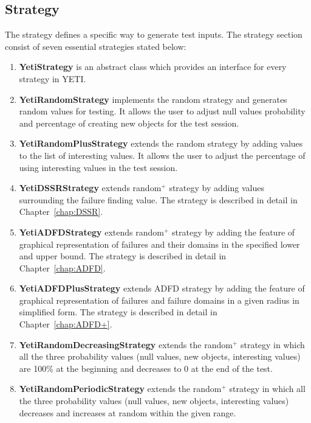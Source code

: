 \subsection{Strategy}
The strategy defines a specific way to generate test inputs. The strategy section consist of seven essential strategies stated below:
\begin{enumerate}
\item {\textbf{YetiStrategy}} is an abstract class which provides an interface for every strategy in YETI.
\item {\textbf{YetiRandomStrategy}} implements the random strategy and generates random values for testing. It allows the user to adjust null values probability and percentage of creating new objects for the test session. 
\item {\textbf{YetiRandomPlusStrategy}} extends the random strategy by adding values to the list of interesting values. It allows the user to adjust the percentage of using interesting values in the test session.
\item {\textbf{YetiDSSRStrategy}} extends random$^+$ strategy by adding values surrounding the failure finding value. The strategy is described in detail in Chapter~\ref{chap:DSSR}.
\item {\textbf{YetiADFDStrategy}} extends random$^+$ strategy by adding the feature of graphical representation of failures and their domains in the specified lower and upper bound. The strategy is described in detail in Chapter~\ref{chap:ADFD}.
\item {\textbf{YetiADFDPlusStrategy}} extends ADFD strategy by adding the feature of graphical representation of failures and failure domains in a given radius in simplified form. The strategy is described in detail in Chapter~\ref{chap:ADFD+}.
\item {\textbf{YetiRandomDecreasingStrategy}} extends the random$^+$ strategy in which all the three probability values (null values, new objects, interesting values) are 100\% at the beginning and decreases to 0 at the end of the test.
\item {\textbf{YetiRandomPeriodicStrategy}} extends the random$^+$ strategy in which all the three probability values (null values, new objects, interesting values) decreases and increases at random within the given range.
\end{enumerate}






